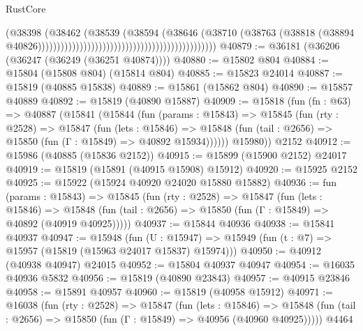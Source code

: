 \begin{lexlean}{RustCore}
\begin{coremodule}
                                                                                (@38398
                                                                                  (@38462
                                                                                    (@38539
                                                                                      (@38594
                                                                                        (@38646
                                                                                          (@38710
                                                                                            (@38763
                                                                                              (@38818
                                                                                                (@38894
                                                                                                  @40826)))))))))))))))))))))))))))))))))))))))))))))))
@40879 := @36181 (@36206 (@36247 (@36249 (@36251 @40874))))
@40880 := @15802 @804
@40884 := @15804 (@15808 @804) (@15814 @804)
@40885 := @15823 @24014
@40887 := @15819 (@40885 @15838)
@40889 := @15861 (@15862 @804)
@40890 := @15857 @40889
@40892 := @15819 (@40890 @15887)
@40909 := @15818
    (fun (fn : @63) =>
    @40887
      (@15841
        (@15844
          (fun (params : @15843) =>
          @15845
            (fun (rty : @2528) =>
            @15847
              (fun (lets : @15846) =>
              @15848 (fun (tail : @2656) => @15850 (fun (Γ : @15849) => @40892 @15934))))))
        @15980))
    @2152
@40912 := @15986 (@40885 (@15836 @2152))
@40915 := @15899 (@15900 @2152) @24017
@40919 := @15819 (@15891 (@40915 @15908) @15912)
@40920 := @15925 @2152
@40925 := @15922 (@15924 @40920 @24020 @15880 @15882)
@40936 := fun (params : @15843) =>
  @15845
    (fun (rty : @2528) =>
    @15847
      (fun (lets : @15846) =>
      @15848 (fun (tail : @2656) => @15850 (fun (Γ : @15849) => @40892 (@40919 @40925)))))
@40937 := @15844 @40936
@40938 := @15841 @40937
@40947 := @15948
    (fun (U : @15947) => @15949 (fun (t : @7) => @15957 (@15819 (@15963 @24017 @15837) @15974)))
@40950 := @40912 (@40938 @40947) @24015
@40952 := @15804 @40937 @40947
@40954 := @16035 @40936 @5832
@40956 := @15819 (@40890 @23843)
@40957 := @40915 @23846
@40958 := @15891 @40957
@40960 := @15819 (@40958 @15912)
@40971 := @16038
    (fun (rty : @2528) =>
    @15847
      (fun (lets : @15846) =>
      @15848 (fun (tail : @2656) => @15850 (fun (Γ : @15849) => @40956 (@40960 @40925)))))
    @4464

\end{coremodule}
\end{lexlean}
